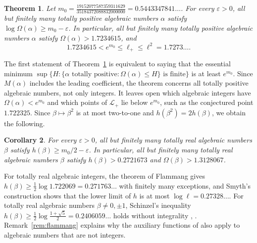 \documentclass[11pt]{amsart}
\newtheorem{theorem}{Theorem}[section]
\newtheorem{corollary}[theorem]{Corollary}
\theoremstyle{remark}
\numberwithin{equation}{section}
\newcommand{\Mzero}{\tfrac{19152077587359311629}{35184372088832000000}}
\newcommand{\MzeroDec}{0.5443347841}
\newcommand{\EMzero}{1.7234615}
\newcommand{\HalfM}{0.2721673}
\newcommand{\EHalfM}{1.3128067}
\newcommand{\FlamVal}{1.722069}
\newcommand{\FlamHalf}{0.271763}
\newcommand{\SmyEllSq}{1.7273}
\newcommand{\SchinzelHalf}{0.2406059}
\begin{document}
\begin{theorem}\label{thm:main}
Let $m_0=\Mzero=\MzeroDec\ldots$. For every $\varepsilon>0$, all but finitely many totally positive algebraic numbers $\alpha$ satisfy $\log\Omega(\alpha)\ge m_0-\varepsilon$. In particular, all but finitely many totally positive algebraic numbers $\alpha$ satisfy $\Omega(\alpha)>\EMzero$, and
\[
\EMzero<e^{m_0}\le\ell_+\le\ell^2=\SmyEllSq\ldots.
\]
\end{theorem}

The first statement of Theorem~\ref{thm:main} is equivalent to saying that the essential minimum $\sup\{H:\{\alpha\text{ totally positive}:\Omega(\alpha)\le H\}\text{ is finite}\}$ is at least $e^{m_0}$. Since $M(\alpha)$ includes the leading coefficient, the theorem concerns all totally positive algebraic numbers, not only integers. It leaves open which algebraic integers have $\Omega(\alpha)<e^{m_0}$ and which points of $\mathcal L_+$ lie below $e^{m_0}$, such as the conjectured point $1.722325$. Since $\beta\mapsto\beta^2$ is at most two-to-one and $h(\beta^2)=2h(\beta)$, we obtain the following.

\begin{corollary}\label{cor:real}
For every $\varepsilon>0$, all but finitely many totally real algebraic numbers $\beta$ satisfy $h(\beta)\ge m_0/2-\varepsilon$. In particular, all but finitely many totally real algebraic numbers $\beta$ satisfy $h(\beta)>\HalfM$ and $\Omega(\beta)>\EHalfM$.
\end{corollary}

For totally real algebraic integers, the theorem of Flammang \cite{Fla15} gives $h(\beta)\ge\frac12\log\FlamVal=\FlamHalf\ldots$ with finitely many exceptions, and Smyth's construction shows that the lower limit of $h$ is at most $\log\ell=0.27328\ldots$. For totally real algebraic numbers $\beta\ne0,\pm1$, Schinzel's inequality $h(\beta)\ge\frac12\log\frac{1+\sqrt5}2=\SchinzelHalf\ldots$ holds without integrality \cite[Theorem~1]{Gar07}, \cite[Section~6.1]{Smy08}. Remark~\ref{rem:flammang} explains why the auxiliary functions of \cite{Fla15} also apply to algebraic numbers that are not integers.
\end{document}
